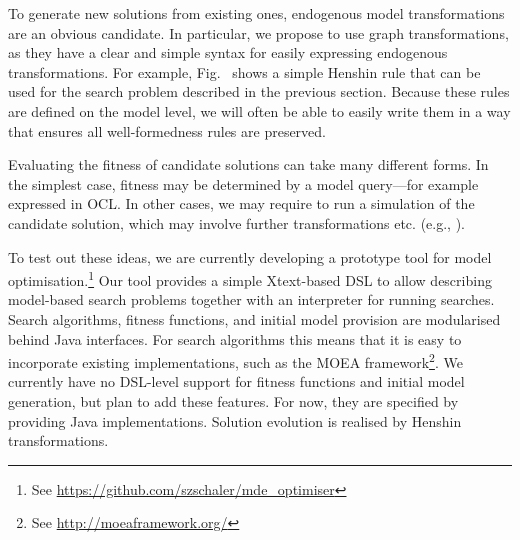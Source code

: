 	To generate new solutions from existing ones, endogenous model transformations are an obvious candidate. In particular, we propose to use graph transformations, as they have a clear and simple
	syntax for easily expressing endogenous transformations. For example, Fig.~ shows a simple Henshin rule that can be used for the search problem described in the previous section.
	Because these rules are defined on the model level, we will often be able to easily write them in a way that ensures all well-formedness rules are preserved.
	
	
	Evaluating the fitness of candidate solutions can take many different forms. In the simplest case, fitness may be determined by a model query---for example expressed in OCL. In other cases, we may
	require to run a simulation of the candidate solution, which may involve further transformations etc. (e.g., \cite{Efstathiou+14,Chatziprimou+14}).
	
	To test out these ideas, we are currently developing a prototype tool for model optimisation.\footnote{See \url{https://github.com/szschaler/mde_optimiser}} Our tool provides a simple Xtext-based
	DSL to allow describing model-based search problems together with an interpreter for running searches. Search algorithms, fitness functions, and initial model provision are modularised behind Java
	interfaces. For search algorithms this means that it is easy to incorporate existing implementations, such as the MOEA framework\footnote{See \url{http://moeaframework.org/}}. We currently have no
	DSL-level support for fitness functions and initial model generation, but plan to add these features. For now, they are specified by providing Java implementations. Solution evolution is realised by
	Henshin transformations.
	
